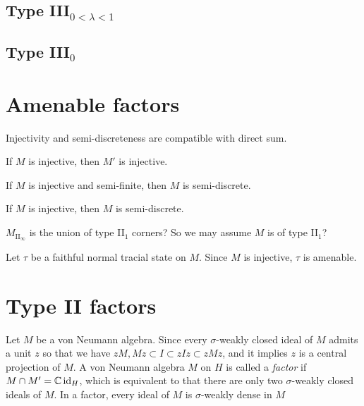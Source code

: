 \documentclass{../../large}
\begin{document}
\section{Type III$_{0<\lambda<1}$}

\section{Type III$_0$}

\chapter{Amenable factors}

Injectivity and semi-discreteness are compatible with direct sum.

\begin{prb}
\begin{parts}
\item If $M$ is injective, then $M'$ is injective.
\item If $M$ is injective and semi-finite, then $M$ is semi-discrete.
\item If $M$ is injective, then $M$ is semi-discrete.
\end{parts}
\end{prb}
\begin{pf}
$M_{\mathrm{II}_\infty}$ is the union of type II$_1$ corners?
So we may assume $M$ is of type II$_1$?

Let $\tau$ be a faithful normal tracial state on $M$.
Since $M$ is injective, $\tau$ is amenable.
\end{pf}

\chapter{Type II factors}

\begin{prb}
Let $M$ be a von Neumann algebra.
Since every $\sigma$-weakly closed ideal of $M$ admits a unit $z$ so that we have $zM,Mz\subset I\subset zIz\subset zMz$, and it implies $z$ is a central projection of $M$.
A von Neumann algebra $M$ on $H$ is called a \emph{factor} if $M\cap M'=\mathbb{C}\operatorname{id}_H$, which is equivalent to that there are only two $\sigma$-weakly closed ideals of $M$.
In a factor, every ideal of $M$ is $\sigma$-weakly dense in $M$
\end{prb}
\end{document}

